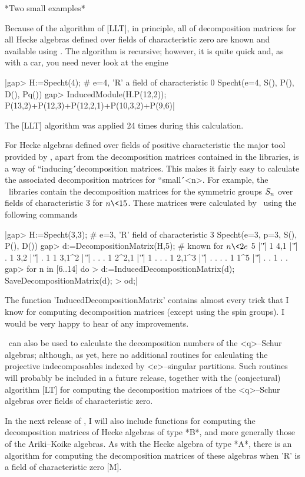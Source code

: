 \medskip

*Two small examples*

Because of the algorithm of [LLT], in principle, all of decomposition 
matrices for all Hecke algebras defined over fields of characteristic zero 
are known and available using \Specht. The algorithm is recursive; 
however, it is quite quick and, as with a car, you need never look at 
the engine\:

|gap> H:=Specht(4);   # e=4, 'R' a field of characteristic 0
Specht(e=4, S(), P(), D(), Pq())
gap> InducedModule(H.P(12,2));
P(13,2)+P(12,3)+P(12,2,1)+P(10,3,2)+P(9,6)|

The [LLT] algorithm was applied 24 times during this calculation.

For Hecke algebras defined over fields of positive characteristic the 
major tool provided by \Specht, apart from the decomposition matrices 
contained in the libraries, is a way of ``inducing\'\'\ decomposition 
matrices. This makes it fairly easy to calculate the associated 
decomposition matrices for ``small\'\'\ <n>. For example, the \Specht\ 
libraries contain the decomposition matrices for the symmetric groups 
$S_n$ over fields of characteristic 3 for $n\<15$.  These matrices 
were calculated by \Specht\ using the following commands\:

|gap> H:=Specht(3,3);   # e=3, 'R' field of characteristic 3
Specht(e=3, p=3, S(), P(), D())
gap> d:=DecompositionMatrix(H,5);  # known for $n\<2e$
5     |'\|'| 1         
4,1   |'\|'| . 1       
3,2   |'\|'| . 1 1     
3,1^2 |'\|'| . . . 1   
2^2,1 |'\|'| 1 . . . 1
2,1^3 |'\|'| . . . . 1
1^5   |'\|'| . . 1 . . 
gap> for n in [6..14] do
>       d:=InducedDecompositionMatrix(d); SaveDecompositionMatrix(d);  
>    od;|

The function 'InducedDecompositionMatrix' contains almost every trick 
that I know for computing decomposition matrices (except using the spin
groups). I would be very happy to hear of any improvements.

\Specht\ can also be used to calculate the decomposition numbers of the
<q>--Schur algebras; although, as yet,  here no additional routines for
calculating the projective indecomposables indexed by <e>--singular
partitions. Such routines will probably be included in a future release,
together with the (conjectural) algorithm [LT] for computing the 
decomposition matrices of the <q>--Schur algebras over fields of 
characteristic zero. 

In the next release of \Specht, I will also include functions for
computing the decomposition matrices of Hecke algebras of type *B*, and
more generally those of the Ariki--Koike algebras. As with the Hecke
algebra of type *A*, there is an algorithm for computing the decomposition
matrices of these algebras when 'R' is a field of characteristic zero [M].

